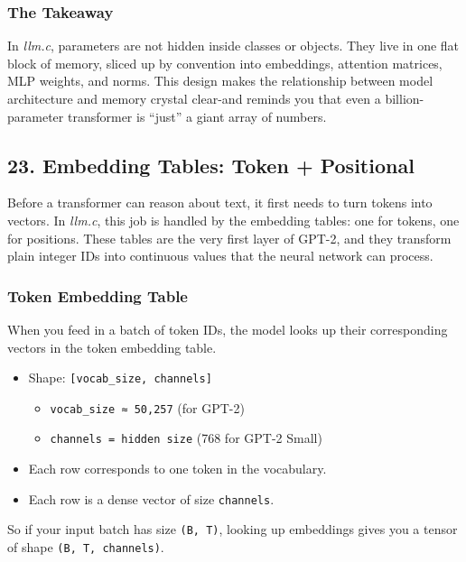 \documentclass[
  letterpaper,
  DIV=11,
  numbers=noendperiod]{scrreprt}
\providecommand{\tightlist}{%
  \setlength{\itemsep}{0pt}\setlength{\parskip}{0pt}}
\begin{document}
\subsubsection{The Takeaway}\label{the-takeaway-11}

In \emph{llm.c}, parameters are not hidden inside classes or objects.
They live in one flat block of memory, sliced up by convention into
embeddings, attention matrices, MLP weights, and norms. This design
makes the relationship between model architecture and memory crystal
clear-and reminds you that even a billion-parameter transformer is
``just'' a giant array of numbers.

\subsection{23. Embedding Tables: Token +
Positional}\label{embedding-tables-token-positional}

Before a transformer can reason about text, it first needs to turn
tokens into vectors. In \emph{llm.c}, this job is handled by the
embedding tables: one for tokens, one for positions. These tables are
the very first layer of GPT-2, and they transform plain integer IDs into
continuous values that the neural network can process.

\subsubsection{Token Embedding Table}\label{token-embedding-table}

When you feed in a batch of token IDs, the model looks up their
corresponding vectors in the token embedding table.

\begin{itemize}
\item
  Shape: \texttt{{[}vocab\_size,\ channels{]}}

  \begin{itemize}
  \tightlist
  \item
    \texttt{vocab\_size\ ≈\ 50,257} (for GPT-2)
  \item
    \texttt{channels\ =\ hidden\ size} (768 for GPT-2 Small)
  \end{itemize}
\item
  Each row corresponds to one token in the vocabulary.
\item
  Each row is a dense vector of size \texttt{channels}.
\end{itemize}

So if your input batch has size \texttt{(B,\ T)}, looking up embeddings
gives you a tensor of shape \texttt{(B,\ T,\ channels)}.
\end{document}
